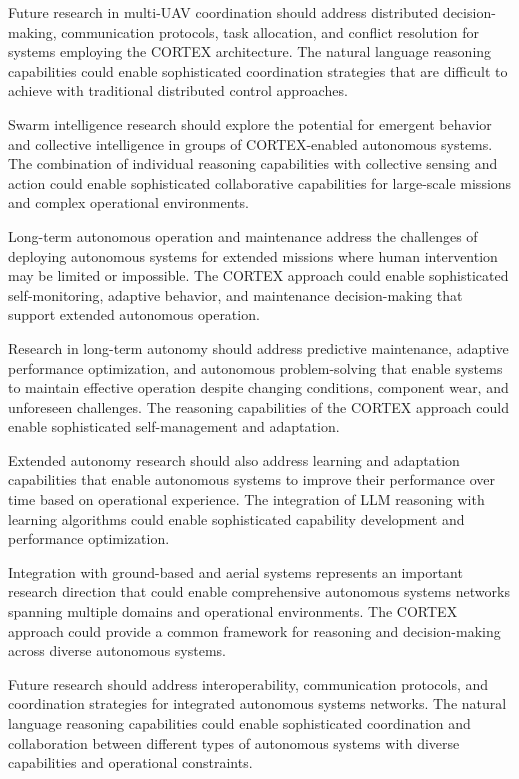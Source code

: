 Future research in multi-UAV coordination should address distributed decision-making, communication protocols, task allocation, and conflict resolution for systems employing the CORTEX architecture. The natural language reasoning capabilities could enable sophisticated coordination strategies that are difficult to achieve with traditional distributed control approaches.

Swarm intelligence research should explore the potential for emergent behavior and collective intelligence in groups of CORTEX-enabled autonomous systems. The combination of individual reasoning capabilities with collective sensing and action could enable sophisticated collaborative capabilities for large-scale missions and complex operational environments.

Long-term autonomous operation and maintenance address the challenges of deploying autonomous systems for extended missions where human intervention may be limited or impossible. The CORTEX approach could enable sophisticated self-monitoring, adaptive behavior, and maintenance decision-making that support extended autonomous operation.

Research in long-term autonomy should address predictive maintenance, adaptive performance optimization, and autonomous problem-solving that enable systems to maintain effective operation despite changing conditions, component wear, and unforeseen challenges. The reasoning capabilities of the CORTEX approach could enable sophisticated self-management and adaptation.

Extended autonomy research should also address learning and adaptation capabilities that enable autonomous systems to improve their performance over time based on operational experience. The integration of LLM reasoning with learning algorithms could enable sophisticated capability development and performance optimization.

Integration with ground-based and aerial systems represents an important research direction that could enable comprehensive autonomous systems networks spanning multiple domains and operational environments. The CORTEX approach could provide a common framework for reasoning and decision-making across diverse autonomous systems.

Future research should address interoperability, communication protocols, and coordination strategies for integrated autonomous systems networks. The natural language reasoning capabilities could enable sophisticated coordination and collaboration between different types of autonomous systems with diverse capabilities and operational constraints.

